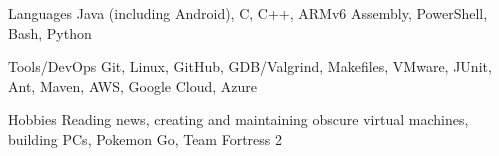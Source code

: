 

\begin{cvskills}


  \cvskill
    {Languages} %
    {Java (including Android), C, C++, ARMv6 Assembly, PowerShell, Bash, Python} %
    
  \cvskill
    {Tools/DevOps} %
    {Git, Linux, GitHub, GDB/Valgrind, Makefiles, VMware, JUnit, Ant, Maven, AWS, Google Cloud, Azure} %

  \cvskill
  {Hobbies} %
  {Reading news, creating and maintaining obscure virtual machines, building PCs, Pokemon Go, Team Fortress 2} %

\end{cvskills}
